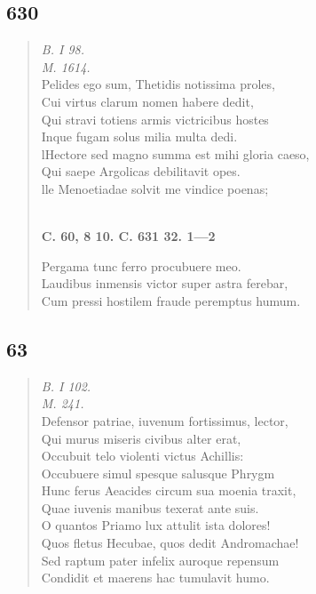 \documentclass[11pt, a4paper]{report}
\begin{document}
            \subsection*{630}
      \begin{verse}
      \textit{B. I 98.} \\ \textit{M. 1614.} \\ Pelides ego sum, Thetidis notissima proles, \\ Cui virtus clarum nomen habere dedit, \\ Qui stravi totiens armis victricibus hostes \\ Inque fugam solus milia multa dedi. \\ lHectore sed magno summa est mihi gloria caeso, \\ Qui saepe Argolicas debilitavit opes. \\ lle Menoetiadae solvit me vindice poenas; \\ 
        ﻿\pagebreak 
     \marginpar{[98]} \begin{center} \textbf{C. 60, 8 10. C. 631 32. 1—2} \end{center}Pergama tunc ferro procubuere meo. \\ Laudibus inmensis victor super astra ferebar, \\ Cum pressi hostilem fraude peremptus humum. \\ 
      \end{verse}
  
            \subsection*{63}
      \begin{verse}
      \textit{B. I 102.} \\ \textit{M. 241.} \\ Defensor patriae, iuvenum fortissimus, lector, \\ Qui murus miseris civibus alter erat, \\ Occubuit telo violenti victus Achillis: \\ Occubuere simul spesque salusque Phrygm \\ Hunc ferus Aeacides circum sua moenia traxit, \\ Quae iuvenis manibus texerat ante suis. \\ O quantos Priamo lux attulit ista dolores! \\ Quos fletus Hecubae, quos dedit Andromachae! \\ Sed raptum pater infelix auroque repensum \\ Condidit et maerens hac tumulavit humo. \\ 
      \end{verse}
  
\end{document}
